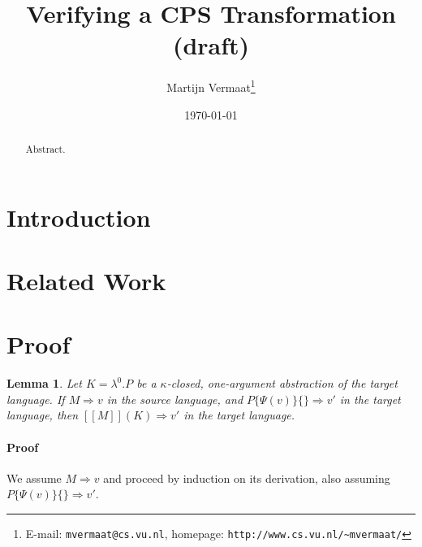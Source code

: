 \documentclass[a4paper,11pt]{article}
\title{Verifying a CPS Transformation (draft)}
\author{Martijn Vermaat\footnote{E-mail: \texttt{mvermaat@cs.vu.nl},
    homepage: \texttt{http://www.cs.vu.nl/\~{}mvermaat/}}}
\date{\today}
\newtheorem{lemma}{Lemma}
\begin{document}
\maketitle


\begin{abstract}
  Abstract.
\end{abstract}


\section{Introduction}\label{sec:introduction}


\section{Related Work}\label{sec:related}


\section{Proof}\label{sec:proof}

\begin{lemma}
  Let $K = \lambda^{0}.P$ be a $\kappa$-closed, one-argument
  abstraction of the target language. If $M \Rightarrow v$ in the
  source language, and $P\{\Psi(v)\}\{\} \Rightarrow v'$ in the target
  language, then $[\![M]\!](K) \Rightarrow v'$ in the target language.
\end{lemma}

\paragraph{Proof}

We assume $M \Rightarrow v$ and proceed by induction on its derivation, also
assuming $P\{\Psi(v)\}\{\} \Rightarrow v'$.

\end{document}
